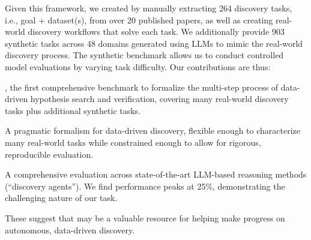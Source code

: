 Given this framework, we created \discoverybench{} by manually extracting 264 discovery tasks, i.e., goal + dataset(s), from over 20 published papers, as well as creating real-world discovery workflows
that solve each task. We additionally provide 903 synthetic tasks across 48
domains generated using LLMs to mimic the real-world discovery process. The synthetic
benchmark allows us to conduct controlled model evaluations by varying task difficulty.
Our contributions are thus:
\begin{ite}
  \item \discoverybench, the first comprehensive benchmark to formalize 
    the multi-step process of data-driven hypothesis search and verification,
    covering many real-world discovery tasks plus additional synthetic tasks.
  \item A pragmatic formalism for data-driven discovery, flexible enough to
    characterize many real-world tasks while constrained enough to allow
    for rigorous, reproducible evaluation.
  \item A comprehensive evaluation across state-of-the-art LLM-based reasoning methods (``discovery agents'').
    We find performance peaks at 25\%, demonstrating the challenging nature of our task.
\end{ite}
These suggest that \discoverybench{} may be a valuable resource for helping make progress
on autonomous, data-driven discovery.


